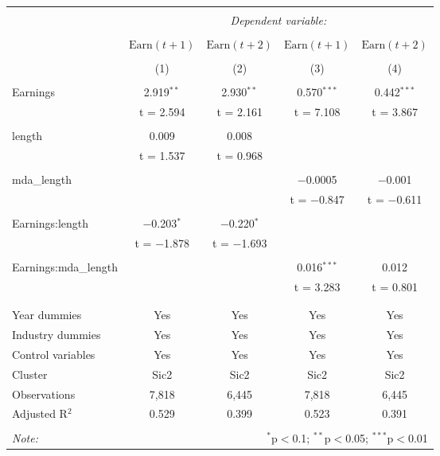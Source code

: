 \documentclass[a4paper]{article}
\begin{document}
\begin{center}
\begin{longtable}{@{\extracolsep{5pt}}lcccc} 
\\[-1.8ex]\hline 
\hline \\[-1.8ex] 
 & \multicolumn{4}{c}{\textit{Dependent variable:}} \\ 
\cline{2-5} 
\\[-1.8ex] & \(\text{Earn}(t{+}1)\) & \(\text{Earn}(t{+}2)\) & \(\text{Earn}(t{+}1)\) & \(\text{Earn}(t{+}2)\) \\ 
\\[-1.8ex] & (1) & (2) & (3) & (4)\\ 
\hline \\[-1.8ex] 
 Earnings & 2.919$^{**}$ & 2.930$^{**}$ & 0.570$^{***}$ & 0.442$^{***}$ \\ 
  & t = 2.594 & t = 2.161 & t = 7.108 & t = 3.867 \\ 
  & & & & \\ 
 length & 0.009 & 0.008 &  &  \\ 
  & t = 1.537 & t = 0.968 &  &  \\ 
  & & & & \\ 
 mda\_length &  &  & $-$0.0005 & $-$0.001 \\ 
  &  &  & t = $-$0.847 & t = $-$0.611 \\ 
  & & & & \\ 
 Earnings:length & $-$0.203$^{*}$ & $-$0.220$^{*}$ &  &  \\ 
  & t = $-$1.878 & t = $-$1.693 &  &  \\ 
  & & & & \\ 
 Earnings:mda\_length &  &  & 0.016$^{***}$ & 0.012 \\ 
  &  &  & t = 3.283 & t = 0.801 \\ 
  & & & & \\ 
\hline \\[-1.8ex] 
Year dummies & Yes & Yes & Yes & Yes \\ 
Industry dummies & Yes & Yes & Yes & Yes \\ 
Control variables & Yes & Yes & Yes & Yes \\ 
Cluster & Sic2 & Sic2 & Sic2 & Sic2 \\ 
Observations & 7,818 & 6,445 & 7,818 & 6,445 \\ 
Adjusted R$^{2}$ & 0.529 & 0.399 & 0.523 & 0.391 \\ 
\hline 
\hline \\[-1.8ex] 
\textit{Note:}  & \multicolumn{4}{r}{$^{*}$p$<$0.1; $^{**}$p$<$0.05; $^{***}$p$<$0.01} \\ 
\end{longtable}
\end{center}
\end{document}
